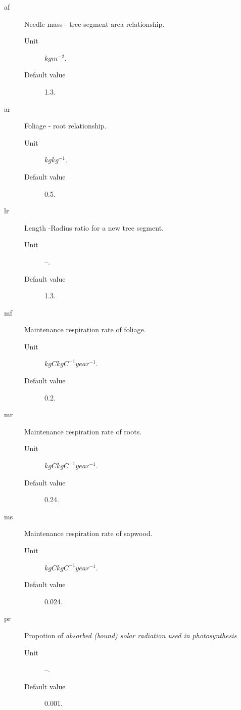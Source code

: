 \begin{description}
  \item[af] Needle mass - tree segment area relationship.
    \begin{description}
       \item[Unit]  $kgm^{-2}$.
       \item[Default value] 1.3.
    \end{description}
  \item[ar] Foliage - root relationship.
    \begin{description}
       \item[Unit] $kgkg^{-1}$. 
       \item[Default value] 0.5.
    \end{description}
  \item[lr] Length -Radius ratio for a new tree segment.
    \begin{description}
       \item[Unit] --.
       \item[Default value] 1.3.
    \end{description}
  \item[mf] Maintenance respiration rate of foliage.
     \begin{description}
        \item[Unit] $kgCkgC^{-1}year^{-1}$.
        \item[Default value] 0.2.
     \end{description} 
  \item[mr] Maintenance respiration rate of roots.
      \begin{description}
         \item[Unit] $kgCkgC^{-1}year^{-1}$.
         \item[Default value] 0.24.
      \end{description}
  \item[ms] Maintenance respiration rate of sapwood. 
      \begin{description}
        \item[Unit] $kgCkgC^{-1}year^{-1}$.
        \item[Default value] 0.024.
      \end{description}
  \item[pr] Propotion of \it absorbed \rm (bound) solar radiation 
            used in photosynthesis 
       \begin{description}
         \item[Unit] --.
         \item[Default value] 0.001.

\end{description}
\end{description}
